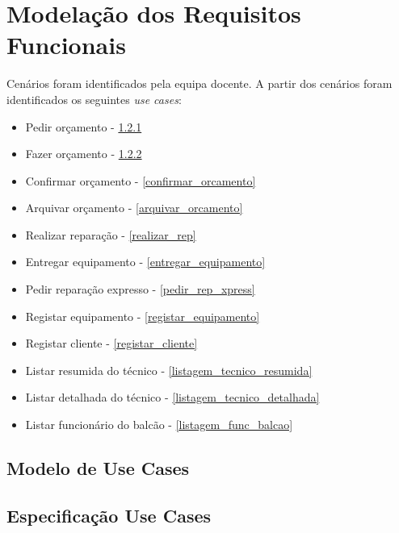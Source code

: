 \documentclass[a4paper, 12pt]{article}
\begin{document}
\section{Modelação dos Requisitos Funcionais}
Cenários foram identificados pela equipa docente.
A partir dos cenários foram identificados os seguintes \textit{use cases}:
\begin{itemize}
        \item Pedir orçamento - \ref{pedir_orcamento}
        \item Fazer orçamento - \ref{fazer_orcamento}
        \item Confirmar orçamento - \ref{confirmar_orcamento}
        \item Arquivar orçamento - \ref{arquivar_orcamento}
        \item Realizar reparação - \ref{realizar_rep}
        \item Entregar equipamento - \ref{entregar_equipamento}
        \item Pedir reparação expresso - \ref{pedir_rep_xpress}
        \item Registar equipamento - \ref{registar_equipamento}
        \item Registar cliente - \ref{registar_cliente}
        \item Listar resumida do técnico - \ref{listagem_tecnico_resumida}
        \item Listar detalhada do técnico - \ref{listagem_tecnico_detalhada}
        \item Listar funcionário do balcão - \ref{listagem_func_balcao}
\end{itemize}
\subsection{Modelo de Use Cases}

\subsection{Especificação Use Cases}

\subsubsection{} \label{pedir_orcamento}


\subsubsection{} \label{fazer_orcamento}

\end{document}
